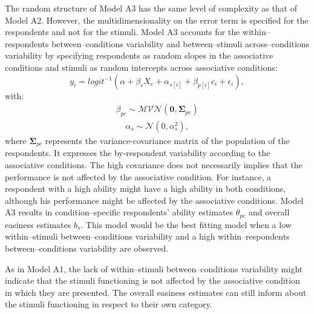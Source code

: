 \documentclass[12pt]{book}
\begin{document}
The random structure of Model A3 has the same level of complexity as that of Model A2. However, the multidimensionality on the error term is specified for the respondents and not for the stimuli. 
Model A3 accounts for the within--respondents between--conditions variability and between--stimuli across--conditions variability by specifying respondents as random slopes in the associative conditions and stimuli as random intercepts across associative conditions: 
%
\begin{equation}\label{Accuracy1}
	y_{i} = logit^{-1}(\alpha + \beta_cX_c + \alpha_{s[i]} +  \beta_{p[i]}c_{i} + \epsilon_{i}),
\end{equation}
with:
\begin{align}
	\beta_{pc} \sim \mathcal{MVN}(\bm{0}, \bm{\Sigma}_{pc})
\end{align}
\begin{align}
	\alpha_s \sim \mathcal{N} (0, \alpha_s^2),
\end{align}
where $\bm{\Sigma}_{pc}$ represents the variance-covariance matrix of the population of the respondents. It expresses the by-respondent variability according to the associative conditions. The high covariance does not necessarily implies that the performance is not affected by the associative condition. For instance, a respondent with a high ability might have a high ability in both conditions, although his performance might be affected by the associative conditions.
Model A3 results in condition--specific respondents' ability estimates $\theta_{pc}$ and overall easiness estimates $b_s$. This model would be the best fitting model when a low within--stimuli between--conditions variability and a high within--respondents between--conditions variability are observed.

As in Model A1, the lack of within--stimuli between--conditions variability might indicate that the stimuli functioning is not affected by the associative condition in which they are presented. The overall easiness estimates can still inform about the stimuli functioning in respect to their own category. 
\end{document}
